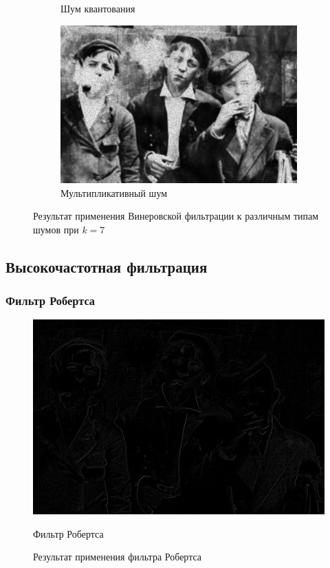 \begin{figure}[ht!]
\begin{subfigure}[b]{0.5\linewidth}
      \caption{Шум квантования} 
      \label{weiner_7:e}
    \end{subfigure}%
    \begin{subfigure}[b]{0.5\linewidth}
        \centering
        \includegraphics[width=0.95\linewidth]{../Wiener_Filter/Wiener_Speckle_noise_(k=7).jpg} 
        \caption{Мультипликативный шум} 
        \label{weiner_7:f} 
    \end{subfigure} 
    \caption{Результат применения Винеровской фильтрации к различным типам шумов при $k = 7$}
    \label{img:weiner_7} 
\end{figure}
\FloatBarrier


\subsection{Высокочастотная фильтрация}
\subsubsection{Фильтр Робертса}

\begin{figure}[ht!]
  \centering
  \includegraphics[width=\textwidth]{../Edge_Detection/Robertson_Smoking_boys.jpg}
  \caption{Фильтр Робертса}
  \caption{Результат применения фильтра Робертса}
  \label{img:roberts}  
\end{figure}
\FloatBarrier

